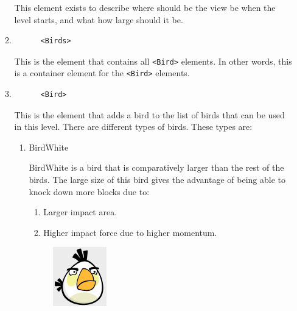\documentclass{dalthesis}
\begin{document}
\begin{enumerate}
\begin{enumerate}
    This element exists to describe where should be the view be when the level starts, and what how large should it be.

    \item

    \begin{lstlisting}
      <Birds>
    \end{lstlisting}

    This is the element that contains all \lstinline{<Bird>} elements. In other words, this is a container element for the \lstinline{<Bird>} elements.

    \item

    \begin{lstlisting}
      <Bird>
    \end{lstlisting}

    This is the element that adds a bird to the list of birds that can be used in this level. There are different types of birds. These types are:

    \begin{enumerate}
      \item BirdWhite

      BirdWhite is a bird that is comparatively larger than the rest of the birds. The large size of this bird gives the advantage of being able to knock down more blocks due to:

      \begin{enumerate}
        \item Larger impact area.
        \item Higher impact force due to higher momentum.
      \end{enumerate}

      \begin{figure}[H]
        \includegraphics[width=.5\textwidth,keepaspectratio]{birds/white.png}
      \end{figure}


\end{enumerate}
\end{enumerate}
\end{enumerate}
\end{document}
